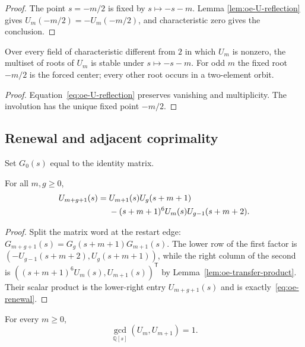 \begin{proof}
The point $s=-m/2$ is fixed by $s\mapsto-s-m$.  Lemma
\ref{lem:oe-U-reflection} gives $U_m(-m/2)=-U_m(-m/2)$, and characteristic
zero gives the conclusion.
\end{proof}

\begin{corollary}\label{cor:oe-root-pairing}
Over every field of characteristic different from $2$ in which $U_m$ is
nonzero, the multiset of roots of $U_m$ is stable under $s\mapsto-s-m$.
For odd $m$ the fixed root $-m/2$ is the forced center; every other root
occurs in a two-element orbit.
\end{corollary}

\begin{proof}
Equation~\eqref{eq:oe-U-reflection} preserves vanishing and multiplicity.
The involution has the unique fixed point $-m/2$.
\end{proof}

\subsection{Renewal and adjacent coprimality}

Set $G_0(s)$ equal to the identity matrix.

\begin{theorem}\label{thm:oe-renewal}
For all $m,g\ge0$,
\begin{align}
U_{m+g+1}(s)
={}&U_{m+1}(s)U_g(s+m+1)\notag\\
&-(s+m+1)^6U_m(s)U_{g-1}(s+m+2).
\label{eq:oe-renewal}
\end{align}
\end{theorem}

\begin{proof}
Split the matrix word at the restart edge:
$G_{m+g+1}(s)=G_g(s+m+1)G_{m+1}(s)$.  The lower row of the first factor is
$(-U_{g-1}(s+m+2),U_g(s+m+1))$, while the right column of the second is
$((s+m+1)^6U_m(s),U_{m+1}(s))^{\mathsf T}$ by
Lemma~\ref{lem:oe-transfer-product}.  Their scalar product is the
lower-right entry $U_{m+g+1}(s)$ and is exactly~\eqref{eq:oe-renewal}.
\end{proof}

\begin{theorem}\label{thm:oe-adjacent-coprime}
For every $m\ge0$,
\[
 \gcd_{\mathbb Q[s]}(U_m,U_{m+1})=1.
\]
\end{theorem}

